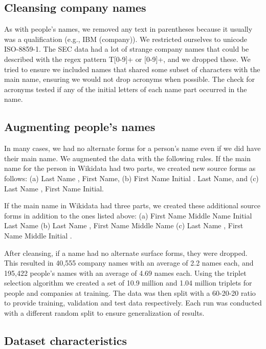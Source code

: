 \subsection{Cleansing company names}
As with people's names, we removed any text in parentheses because it usually was a qualification (e.g., IBM (company)).  We restricted ourselves to unicode ISO-8859-1.  The SEC data had a lot of strange company names that could be described with the regex pattern T[0-9]+ or [0-9]+, and we dropped these.  We tried to ensure we included names that shared some subset of characters with the main name, ensuring we would not drop acronyms when possible.  The check for acronyms tested if any of the initial letters of each name part occurred in the name.

\subsection{Augmenting people's names}
In many cases, we had no alternate forms for a person's name even if we did have their main name.  We augmented the data with the following rules.  If the main name for the person in Wikidata had two parts, we created new source forms as follows: (a) Last Name , First Name, (b) First Name Initial . Last Name, and (c) Last Name , First Name Initial.

If the main name in Wikidata had three parts, we created these additional source forms in addition to the ones listed above: (a) First Name Middle Name Initial Last Name (b) Last Name , First Name Middle Name (c) Last Name , First Name Middle Initial .

After cleansing, if a name had no alternate surface forms, they were dropped.  This resulted in 40,555 company names with an average of 2.2 names each, and 195,422 people's names with an average of 4.69 names each.  Using the triplet selection algorithm we created a set of 10.9 million and 1.04 million triplets for people and companies at training.  The data was then split with a 60-20-20 ratio to provide training, validation and test data respectively.  Each run was conducted with a different random split to ensure generalization of results.

\subsection{Dataset characteristics}

